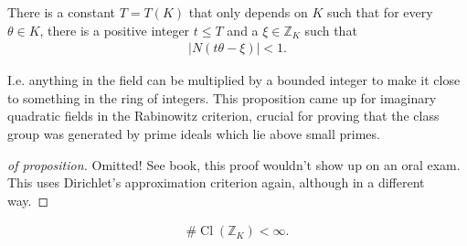 \begin{proposition}

There is a constant \(T = T(K)\) that only depends on \(K\) such that
for every \(\theta\in K\), there is a positive integer \(t \leq T\) and
a \(\xi \in {\mathbb{Z}}_K\) such that
\begin{align*}
{\left\lvert {N(t \theta - \xi ) } \right\rvert} < 1
.\end{align*}

\end{proposition}

\begin{remark}

I.e. anything in the field can be multiplied by a bounded integer to
make it close to something in the ring of integers. This proposition
came up for imaginary quadratic fields in the Rabinowitz criterion,
crucial for proving that the class group was generated by prime ideals
which lie above small primes.

\end{remark}

\begin{proof}[of proposition]

Omitted! See book, this proof wouldn't show up on an oral exam. This
uses Dirichlet's approximation criterion again, although in a different
way.

\end{proof}

\begin{theorem}

\begin{align*}
\# \operatorname{Cl}({\mathbb{Z}}_K) < \infty 
.\end{align*}

\end{theorem}

